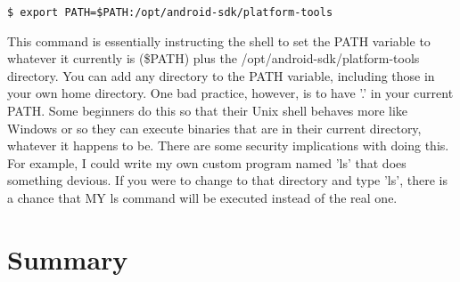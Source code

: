 \begin{verbatim}
$ export PATH=$PATH:/opt/android-sdk/platform-tools
\end{verbatim}

This command is essentially instructing the shell to set the PATH variable to whatever it currently is (\$PATH) plus the /opt/android-sdk/platform-tools directory.  You can add any directory to the PATH variable, including those in your own home directory.  One bad practice, however, is to have '.' in your current PATH.  Some beginners do this so that their Unix shell behaves more like Windows or so they can execute binaries that are in their current directory, whatever it happens to be.  There are some security implications with doing this.  For example, I could write my own custom program named 'ls' that does something devious.  If you were to change to that directory and type 'ls', there is a chance that MY ls command will be executed instead of the real one.

\section*{Summary}

